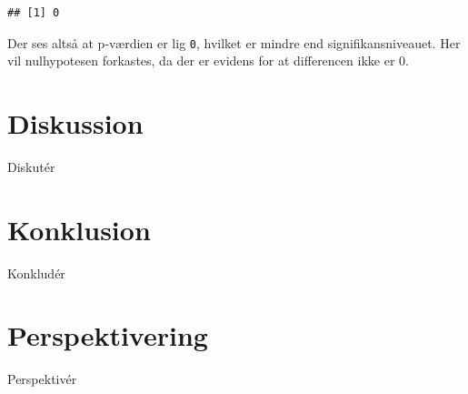 \documentclass[
]{book}
\theoremstyle{definition}
\theoremstyle{definition}
\theoremstyle{definition}
\theoremstyle{remark}
\begin{document}
\begin{verbatim}
## [1] 0
\end{verbatim}

Der ses altså at p-værdien er lig \texttt{0}, hvilket er mindre end signifikansniveauet. Her vil nulhypotesen forkastes, da der er evidens for at differencen ikke er \(0\).

\hypertarget{diskussion}{%
\chapter{Diskussion}\label{diskussion}}

Diskutér

\hypertarget{konklusion}{%
\chapter{Konklusion}\label{konklusion}}

Konkludér

\hypertarget{perspektivering}{%
\chapter{Perspektivering}\label{perspektivering}}

Perspektivér

  
\end{document}
